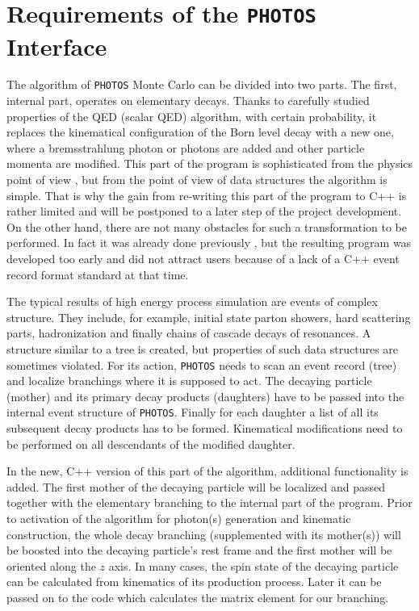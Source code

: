 \documentclass[]{Photos_interface_design}
\begin{document}
\section{Requirements of the {\tt PHOTOS} Interface}
\label{sec:requrements}
The algorithm of {\tt PHOTOS} Monte Carlo can be divided into two parts.
The first, internal part, operates on elementary decays. Thanks to carefully 
studied properties of the 
QED (scalar QED) algorithm, with certain probability, 
it replaces the kinematical configuration of the Born level decay with a new one, 
where a bremsstrahlung photon or photons
are added and other particle momenta are modified. This part of the program is sophisticated from the physics 
point of view \cite{Golonka:2006tw,Nanava:2006vv},
but from the point of view of data structures the algorithm is simple.
That is why the gain from re-writing this part of the program to C++ is rather
limited and will be postponed to a later step of the project development.
On the other hand, there are not many obstacles for such a transformation to be
performed. In fact it was already done
previously \cite{photosplus}, but the resulting program was developed too early 
and did not attract users because of a lack of a C++ event record format standard at that time.

The typical results of high energy process simulation are events of complex structure.
They include, for example, initial state parton showers, hard scattering parts,
hadronization and finally chains of cascade decays of resonances. 
A structure similar to a tree is created, but properties of such data structures
are sometimes violated.
For its action, {\tt PHOTOS} needs to scan an event record (tree) 
and localize branchings where
it is supposed to act. The decaying particle (mother) and its primary decay products
(daughters) have to be passed into the internal event structure of {\tt PHOTOS}. 
Finally for each daughter a list of all its subsequent decay products has to be 
formed. Kinematical modifications need to be performed on all descendants of the modified daughter.

In the new, C++ version of this part of the algorithm, additional functionality
is added.
The first mother of the decaying particle will be localized and passed together with  
the elementary branching to the internal part of the program. 
Prior to activation of the algorithm for  photon(s) generation and kinematic construction,
 the whole decay branching 
(supplemented with its mother(s))
will be boosted into the decaying particle's rest frame and the first mother
will be oriented along the $z$ axis. 
In many cases, the spin state of the decaying particle  can be calculated from kinematics of its production process.
Later it can be passed on to the code which calculates the matrix element for our branching.
\end{document}
